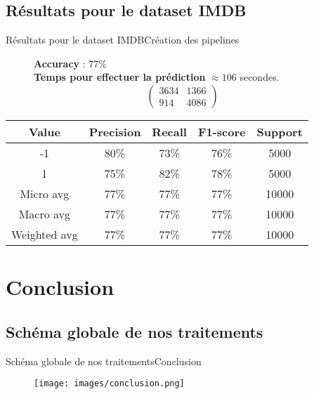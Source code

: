 \documentclass[usenames,dvipsnames]{beamer}
\begin{document}
\subsection{Résultats pour le dataset IMDB}
\begin{frame}{Résultats pour le dataset IMDB}{Création des pipelines}
\begin{figure}[!ht]
  \centering
  \textbf{Accuracy} : 77\% \\
  \textbf{Temps pour effectuer la prédiction} $\approx106$ secondes.
  $$
  \begin{pmatrix}
  3634 & 1366 \\
  914 & 4086
  \end{pmatrix}
  $$
\end{figure}

\begin{table}
  \centering
  \begin{tabular}{|c|c|c|c|c|}
    \hline
    \textbf{Value} & \textbf{Precision} & \textbf{Recall} & \textbf{F1-score} & \textbf{Support}\\
    \hline
    \hline
    -1 & 80\% & 73\% & 76\% & 5000\\
    \hline
    1 & 75\% & 82\% & 78\% & 5000\\
    \hline
    Micro avg & 77\% & 77\% & 77\% & 10000\\
    \hline
    Macro avg & 77\% & 77\% & 77\% & 10000\\
    \hline
    Weighted avg & 77\% & 77\% & 77\% & 10000\\
    \hline
  \end{tabular}
\end{table}
\end{frame}

\section{Conclusion}
\subsection{Schéma globale de nos traitements}
\begin{frame}{Schéma globale de nos traitements}{Conclusion}
\begin{figure}
    \centering
    \texttt{[image: images/conclusion.png]}
\end{figure}
\end{frame}
\end{document}
